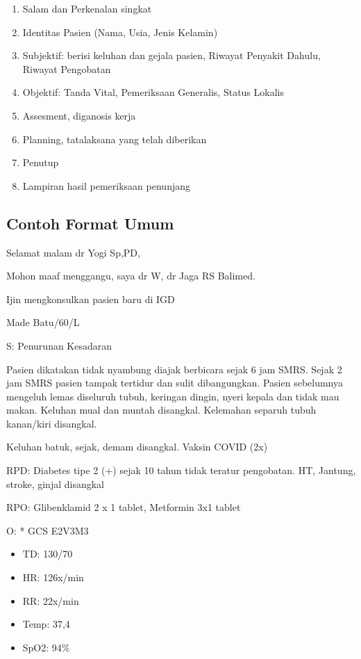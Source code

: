 \documentclass[
]{book}
\providecommand{\tightlist}{%
  \setlength{\itemsep}{0pt}\setlength{\parskip}{0pt}}
\begin{document}
\begin{enumerate}
\def\labelenumi{\arabic{enumi}.}
\tightlist
\item
  Salam dan Perkenalan singkat
\item
  Identitas Pasien (Nama, Usia, Jenis Kelamin)
\item
  Subjektif: berisi keluhan dan gejala pasien, Riwayat Penyakit Dahulu, Riwayat Pengobatan
\item
  Objektif: Tanda Vital, Pemeriksaan Generalis, Status Lokalis
\item
  Assesment, diganosis kerja
\item
  Planning, tatalaksana yang telah diberikan
\item
  Penutup
\item
  Lampiran hasil pemeriksaan penunjang
\end{enumerate}

\hypertarget{contoh-format-umum}{%
\subsection{Contoh Format Umum}\label{contoh-format-umum}}

Selamat malam dr Yogi Sp,PD,

Mohon maaf menggangu, saya dr W, dr Jaga RS Balimed.

Ijin mengkonsulkan pasien baru di IGD

Made Batu/60/L

S: Penurunan Kesadaran

Pasien dikatakan tidak nyambung diajak berbicara sejak 6 jam SMRS. Sejak 2 jam SMRS pasien tampak tertidur dan sulit dibangungkan. Pasien sebelumnya mengeluh lemas diseluruh tubuh, keringan dingin, nyeri kepala dan tidak mau makan. Keluhan mual dan muntah disangkal. Kelemahan separuh tubuh kanan/kiri disangkal.

Keluhan batuk, sejak, demam disangkal. Vaksin COVID (2x)

RPD:
Diabetes tipe 2 (+) sejak 10 tahun tidak teratur pengobatan. HT, Jantung, stroke, ginjal disangkal

RPO:
Glibenklamid 2 x 1 tablet, Metformin 3x1 tablet

O:
* GCS E2V3M3

\begin{itemize}
\item
  TD: 130/70
\item
  HR: 126x/min
\item
  RR: 22x/min
\item
  Temp: 37,4
\item
  SpO2: 94\%
\end{itemize}
\end{document}
